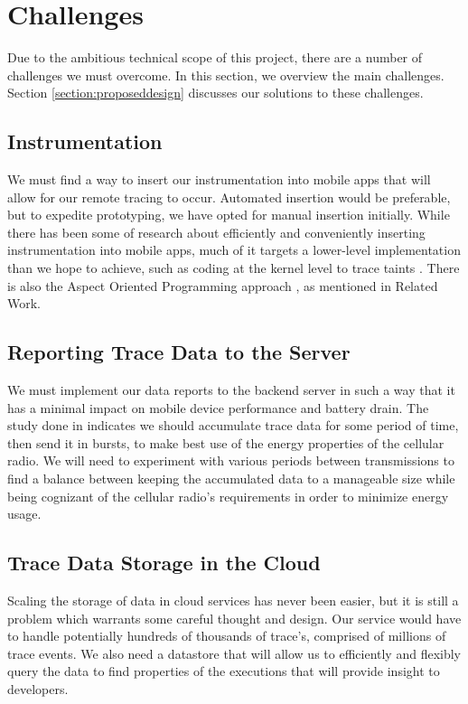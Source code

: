 \section{Challenges}
\label{section:challenges}
Due to the ambitious technical scope of this project, there are a number of challenges we must overcome.
In this section, we overview the main challenges. Section \ref{section:proposeddesign} discusses
our solutions to these challenges.

\subsection{Instrumentation}
We must find a way to insert our instrumentation into mobile apps that will
allow for our remote tracing to occur. Automated insertion would be preferable,
but to expedite prototyping, we have opted for manual insertion initially.
While there has been some of research about efficiently and conveniently inserting
instrumentation into mobile apps, much of it targets a lower-level implementation than
we hope to achieve, such as coding at the kernel level to trace taints \cite{TaintDroid}.
There is also the Aspect Oriented Programming approach \cite{COCA}, as mentioned in Related Work.

\subsection{Reporting Trace Data to the Server}
We must implement our data reports to the backend server in such a way that it
has a minimal impact on mobile device performance and battery drain. The study done
in \cite{PeriodicTransfers} indicates we should accumulate trace data for some
period of time, then send it in bursts, to make best use of the energy properties
of the cellular radio. We will need to experiment with various
periods between transmissions to find a balance between keeping the accumulated data to a manageable
size while being cognizant of the cellular radio's requirements in order to minimize
energy usage.

\subsection{Trace Data Storage in the Cloud}
Scaling the storage of data in cloud services has never been easier,
but it is still a problem which warrants some careful thought and design.
Our service would have to handle potentially hundreds of thousands of trace's,
comprised of millions of trace events. We also need a datastore that will allow
us to efficiently and flexibly query the data to find properties of the executions that will
provide insight to developers.

